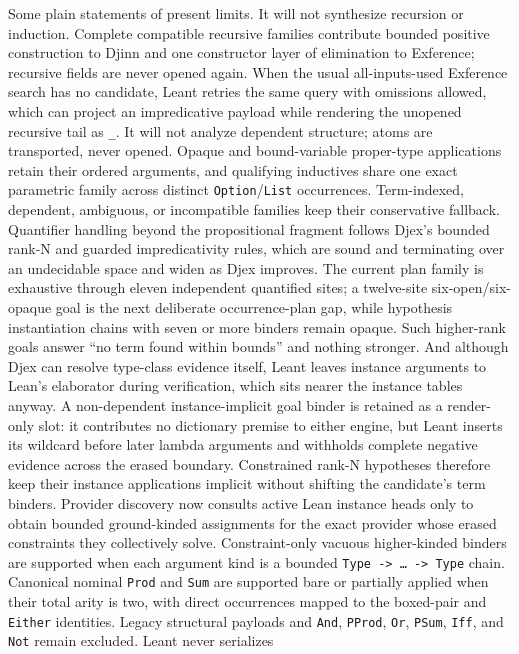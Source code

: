 \documentclass[11pt,oneside]{article}
\newcommand{\code}[1]{\texttt{#1}}
\begin{document}
Some plain statements of present limits. It will not synthesize recursion or
induction. Complete compatible recursive families contribute bounded positive
construction to Djinn and one constructor layer of elimination to Exference;
recursive fields are never opened again.  When the usual all-inputs-used
Exference search has no candidate, Leant retries the same query with
omissions allowed, which can project an impredicative payload while
rendering the unopened recursive tail as \code{\_}. It will not analyze dependent
structure; atoms are transported, never opened. Opaque and bound-variable
proper-type applications retain their ordered arguments, and qualifying
inductives share one exact parametric family across distinct
\code{Option}/\code{List} occurrences. Term-indexed, dependent,
ambiguous, or incompatible families keep their conservative fallback.
Quantifier handling beyond the propositional fragment follows
Djex's bounded rank-N and guarded impredicativity rules, which are
sound and terminating over an undecidable space and widen as Djex
improves. The current plan family is exhaustive through eleven
independent quantified sites; a twelve-site six-open/six-opaque goal
is the next deliberate occurrence-plan gap, while hypothesis
instantiation chains with seven or more binders remain opaque. Such
higher-rank goals answer ``no term
found within bounds'' and nothing stronger. And although Djex can resolve
type-class evidence itself, Leant leaves instance arguments to Lean's
elaborator during verification, which sits nearer the instance tables
anyway. A non-dependent instance-implicit goal binder is retained as a
render-only slot: it contributes no dictionary premise to either engine, but
Leant inserts its wildcard before later lambda arguments and withholds complete
negative evidence across the erased boundary. Constrained rank-N hypotheses
therefore keep their instance applications implicit without shifting the
candidate's term binders. Provider discovery now consults active Lean instance
heads only to obtain bounded ground-kinded assignments for the exact provider
whose erased constraints they collectively solve. Constraint-only vacuous
higher-kinded binders are supported when each argument kind is a bounded
\code{Type~->~\dots~->~Type} chain. Canonical nominal \code{Prod} and
\code{Sum} are supported bare or partially applied when their total arity is
two, with direct occurrences mapped to the boxed-pair and \code{Either}
identities. Legacy structural payloads and \code{And}, \code{PProd}, \code{Or},
\code{PSum}, \code{Iff}, and \code{Not} remain excluded. Leant never serializes
\end{document}
